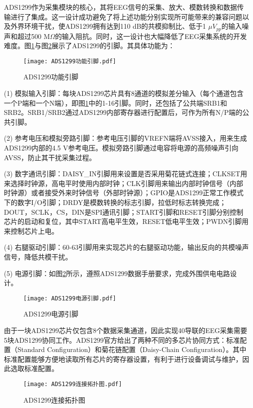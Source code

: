 ADS1299作为采集模块的核心，其将EEG信号的采集、放大、模数转换和数据传输进行了集成。这一设计成功避免了将上述功能分别实现所可能带来的兼容问题以及外界环境干扰，使ADS1299拥有达到110 dB的共模抑制比、低于1 $\mu V_{pp}$的输入噪声和超过500 M$\Omega$的输入阻抗。同时，这一设计也大幅降低了EEG采集系统的开发难度。图\ref{fig2-10}与图\ref{fig2-11}展示了ADS1299的引脚。其具体功能为：

\begin{figure}[h]
	\centering
	\texttt{[image: ADS1299功能引脚.pdf]}
	\caption{ADS1299功能引脚}
	\label{fig2-10}
\end{figure}


(1) 模拟输入引脚：每块ADS1299芯片具有8通道的模拟差分输入（每个通道包含一个P端和一个N端），即图\ref{fig2-10}中的1-16引脚。同时，还包括了公共端SRB1和SRB2。SRB1/SRB2通过ADS1299内部寄存器进行配置后，可作为所有N/P端的公共引脚。

(2) 参考电压和模拟旁路引脚：参考电压引脚的VREFN端将AVSS接入，用来生成ADS1299内部的4.5 V参考电压。模拟旁路引脚通过电容将电源的高频噪声引向AVSS，防止其干扰采集过程。

(3) 数字通讯引脚：DAISY\_IN引脚用来设置是否采用菊花链式连接；CLKSET用来选择时钟源，高电平时使用内部时钟；CLK引脚用来输出内部时钟信号（内部时钟源）或者接受外来时钟信号（外部时钟源）；GPIO是ADS1299正常工作模式下的数字I/O引脚；DRDY是模数转换的标志引脚，拉低时标志转换完成；DOUT，SCLK，CS，DIN是SPI通讯引脚；START引脚和RESET引脚分别控制芯片的启动和复位，其中START高电平生效，RESET低电平生效；PWDN引脚用来控制芯片上电。

(4) 右腿驱动引脚：60-63引脚用来实现芯片的右腿驱动功能，输出反向的共模噪声信号，降低共模干扰。

(5) 电源引脚：如图\ref{fig2-11}所示，遵照ADS1299数据手册要求，完成外围供电电路设计。


\begin{figure}[h]
	\centering
	\texttt{[image: ADS1299电源引脚.pdf]}
	\caption{ADS1299电源引脚} 
	\label{fig2-11}
\end{figure}

由于一块ADS1299芯片仅包含8个数据采集通道，因此实现40导联的EEG采集需要5块ADS1299协同工作。ADS1299官方给出了两种不同的多芯片协同方式：标准配置（Standard Configuration）和菊花链配置（Daisy-Chain Configuration）。其中标准配置能够方便地读取所有芯片的寄存器设置，有利于进行设备调试与维护，因此选取标准配置。
\begin{figure}[!h]
	\centering
	\texttt{[image: ADS1299连接拓扑图.pdf]}
	\caption{ADS1299连接拓扑图} 
	\label{fig2-12}
\end{figure}


